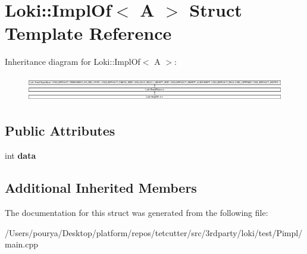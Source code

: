\hypertarget{structLoki_1_1ImplOf_3_01A_01_4}{}\section{Loki\+:\+:Impl\+Of$<$ A $>$ Struct Template Reference}
\label{structLoki_1_1ImplOf_3_01A_01_4}
Inheritance diagram for Loki\+:\+:Impl\+Of$<$ A $>$\+:\begin{figure}[H]
\begin{center}
\leavevmode
\includegraphics[height=1.150685cm]{structLoki_1_1ImplOf_3_01A_01_4}
\end{center}
\end{figure}
\subsection*{Public Attributes}
\begin{DoxyCompactItemize}
\item 
\hypertarget{structLoki_1_1ImplOf_3_01A_01_4_ad58e47995894fbaf9c1a6839bfe50f8b}{}int {\bfseries data}\label{structLoki_1_1ImplOf_3_01A_01_4_ad58e47995894fbaf9c1a6839bfe50f8b}

\end{DoxyCompactItemize}
\subsection*{Additional Inherited Members}


The documentation for this struct was generated from the following file\+:\begin{DoxyCompactItemize}
\item 
/\+Users/pourya/\+Desktop/platform/repos/tetcutter/src/3rdparty/loki/test/\+Pimpl/main.\+cpp\end{DoxyCompactItemize}
